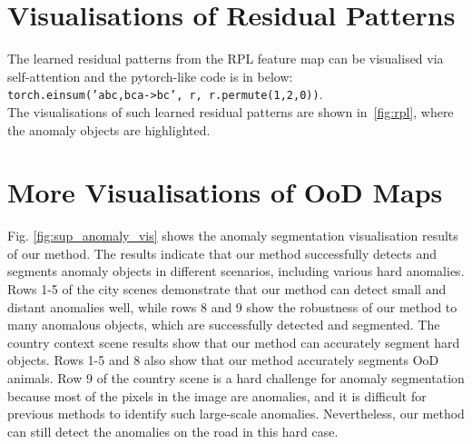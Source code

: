 \documentclass[10pt,twocolumn,letterpaper]{article}
\begin{document}
\section{Visualisations of Residual Patterns}\vspace{-3pt}
The learned residual patterns from the RPL feature map  {\small} can be visualised via self-attention and the pytorch-like code is in below: \\
\texttt{\footnotesize{torch.einsum('abc,bca->bc', r, r.permute(1,2,0))}}. \\
The visualisations of such learned residual patterns are shown in~\cref{fig:rpl}, where the anomaly objects are highlighted.

\section{More Visualisations of OoD Maps} \vspace{-3pt}
Fig. \ref{fig:sup_anomaly_vis} shows the anomaly segmentation visualisation results of our method. The results indicate that our method successfully detects and segments anomaly objects in different scenarios, including various hard anomalies. Rows 1-5 of the city scenes demonstrate that our method can detect small and distant anomalies well, while rows 8 and 9 show the robustness of our method to many anomalous objects, which are successfully detected and segmented. The country context scene results show that our method can accurately segment hard objects. Rows 1-5 and 8 also show that our method accurately segments OoD animals. Row 9 of the country scene is a hard challenge for anomaly segmentation because most of the pixels in the image are anomalies, and it is difficult for previous methods to identify such large-scale anomalies. Nevertheless, our method can still detect the anomalies on the road in this hard case.
\end{document}
